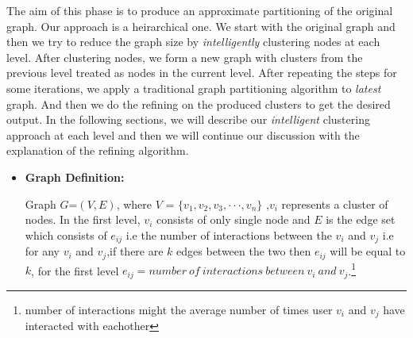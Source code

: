 \documentclass[letterpaper]{article}
\begin{document}
The aim of this phase is to produce an approximate partitioning of the original graph. Our approach is a heirarchical one. 
We start with the original graph and then we try to reduce the graph size by \emph{intelligently} clustering
nodes at each level. After clustering nodes, we form a new graph with clusters from the previous level treated
as nodes in the current level. After repeating the steps for some iterations, we apply a traditional graph
partitioning algorithm to \emph{latest} graph. And then we do the refining on the produced clusters to get
the desired output. In the following sections, we will describe our \emph{intelligent} clustering approach at
each level and then we will continue our discussion with the explanation of the refining algorithm.
\begin{itemize} %

\item \textbf{Graph Definition:}

Graph  $G$=$(V,E)$, where $V$ = $\{v_1,v_2,v_3,\cdot\cdot\cdot,v_n\}$ ,$v_i$ represents a cluster of nodes. 
In the first level, $v_i$ consists of only single node and $E$ is the edge set which consists of $e_{ij}$ i.e the number of interactions between the $v_i$ and $v_j$ i.e for any $v_i$ and $v_j$,if there are $k$ edges between 
the two then $e_{ij}$ will be equal to $k$, for the first level $e_{ij}=number\ of\ interactions\ between\ v_i\ and\ v_j$.\footnote{number of interactions might the average number of times user $v_i$ and $v_j$ have interacted
with eachother} 

\end{itemize} %
\end{document}

